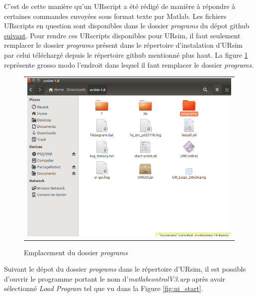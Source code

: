 C'est de cette manière qu'un URscript a été rédigé de manière à répondre à certaines commandes envoyées sous format texte par Matlab.
Les fichiers URscripts en question sont disponibles dans le dossier \textit{programs} du dépot github \href{https://github.com/wonwon0/sujet_special_gmc.git}{suivant}.
Pour rendre ces URscripts disponibles pour URsim, il faut seulement remplacer le dossier \textit{programs} présent dans le répertoire d'instalation d'URsim par celui téléchargé depuis le répertoire github mentionné plus haut. La figure \ref{fig:programs} représente grosso modo l'endroit dans lequel il faut remplacer le dossier \textit{programs}.
\begin{figure}
 \begin{center}
  \begin{tabular}{c}
    \includegraphics[trim=0cm 0cm 0cm 0cm, scale=0.4]{screenshots_tuto_ursim/programs.png}
  \end{tabular}
 \end{center}
\caption{Emplacement du dossier \textit{programs}}
 \label{fig:programs}
\end{figure}

Suivant le dépot du dossier \textit{programs} dans le répertoire d'URsim, il est possible d'ouvrir le programme portant le nom d'\textit{matlabcontrolV3.urp} après avoir sélectionné \textit{Load Program} tel que vu dans la Figure \ref{fig:ui_start}.

